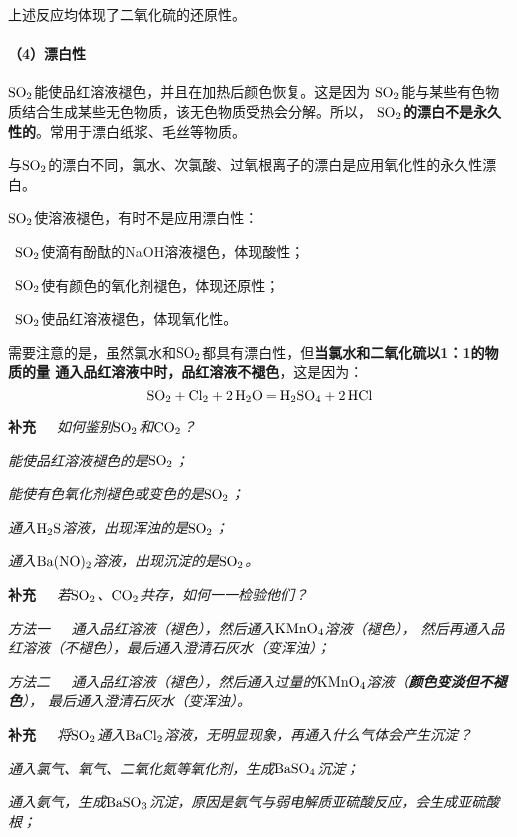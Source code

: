\documentclass[12pt,a4paper]{ctexbook}
\begin{document}
上述反应均体现了二氧化硫的还原性。

\paragraph{（4）漂白性} $\ce{SO2}$能使品红溶液褪色，并且在加热后颜色恢复。这是因为
$\ce{SO2}$能与某些有色物质结合生成某些无色物质，该无色物质受热会分解。所以，\textbf{
	$\ce{SO2}$的漂白不是永久性的}。常用于漂白纸浆、毛丝等物质。

与$\ce{SO2}$的漂白不同，氯水、次氯酸、过氧根离子的漂白是应用氧化性的永久性漂白。

$\ce{SO2}$使溶液褪色，有时不是应用漂白性：

\textbullet \ $\ce{SO2}$使滴有酚酞的NaOH溶液褪色，体现酸性；

\textbullet \ $\ce{SO2}$使有颜色的氧化剂褪色，体现还原性；

\textbullet \ $\ce{SO2}$使品红溶液褪色，体现氧化性。

需要注意的是，虽然氯水和$\ce{SO2}$都具有漂白性，但\textbf{当氯水和二氧化硫以1：1的物质的量
	通入品红溶液中时，品红溶液不褪色}，这是因为：$$\ce{SO2 + Cl2 + 2H2O = H2SO4 + 2HCl}$$

\textbf{补充}\ \ \ \textit{如何鉴别$\ce{SO2}$和$\ce{CO2}$？}

\textbullet \textit{能使品红溶液褪色的是$\ce{SO2}$；}

\textbullet \textit{能使有色氧化剂褪色或变色的是$\ce{SO2}$；}

\textbullet \textit{通入$\ce{H2S}$溶液，出现浑浊的是$\ce{SO2}$；}

\textbullet \textit{通入$\ce{Ba(NO)2}$溶液，出现沉淀的是$\ce{SO2}$。}

\textbf{补充}\ \ \ \textit{若$\ce{SO2}$、$\ce{CO2}$共存，如何一一检验他们？}

\textbullet \textit{方法一\ \ \ 通入品红溶液（褪色），然后通入$\ce{KMnO4}$溶液（褪色），
	然后再通入品红溶液（不褪色），最后通入澄清石灰水（变浑浊）；}

\textbullet \textit{方法二\ \ \ 通入品红溶液（褪色），然后通入过量的$\ce{KMnO4}$溶液（\textbf{颜色变淡但不褪色}），
	最后通入澄清石灰水（变浑浊）。}

\textbf{补充}\ \ \ \textit{将$\ce{SO2}$通入$\ce{BaCl2}$溶液，无明显现象，再通入什么气体会产生沉淀？}

\textbullet \textit{通入氯气、氧气、二氧化氮等氧化剂，生成$\ce{BaSO4}$沉淀；}

\textbullet \textit{通入氨气，生成$\ce{BaSO3}$沉淀，原因是氨气与弱电解质亚硫酸反应，会生成亚硫酸根；}
\end{document}
